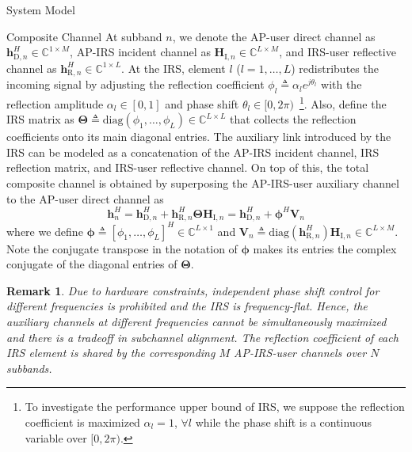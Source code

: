 \documentclass[journal]{IEEEtran}
\newtheorem{remark}{Remark}
\begin{document}
\begin{section}{System Model}
		\begin{subsection}{Composite Channel}
			At subband $n$, we denote the AP-user direct channel as $\boldsymbol{h}_{\mathrm{D},n}^H \in \mathbb{C}^{1 \times M}$, AP-IRS incident channel as $\boldsymbol{H}_{\mathrm{I},n} \in \mathbb{C}^{L \times M}$, and IRS-user reflective channel as $\boldsymbol{h}_{\mathrm{R},n}^H \in \mathbb{C}^{1 \times L}$. At the IRS, element $l$ ($l=1,\dots,L$) redistributes the incoming signal by adjusting the reflection coefficient $\phi_l \triangleq \alpha_l e^{j\theta_l}$ with the reflection amplitude $\alpha_l \in [0,1]$ and phase shift $\theta_l \in [0,2\pi)$~\footnote{To investigate the performance upper bound of IRS, we suppose the reflection coefficient is maximized $\alpha_l=1$, $\forall l$ while the phase shift is a continuous variable over $[0,2\pi)$.}. Also, define the IRS matrix as $\boldsymbol{\Theta} \triangleq \mathrm{diag}(\phi_1, \dots, \phi_L) \in \mathbb{C}^{L \times L}$ that collects the reflection coefficients onto its main diagonal entries. The auxiliary link introduced by the IRS can be modeled as a concatenation of the AP-IRS incident channel, IRS reflection matrix, and IRS-user reflective channel. On top of this, the total composite channel is obtained by superposing the AP-IRS-user auxiliary channel to the AP-user direct channel as
			\begin{equation}\label{eq:h_n}
				\boldsymbol{h}_{n}^H = \boldsymbol{h}_{\mathrm{D},n}^H + \boldsymbol{h}_{\mathrm{R},n}^H \boldsymbol{\Theta} \boldsymbol{H}_{\mathrm{I},n} = \boldsymbol{h}_{\mathrm{D},n}^H + \boldsymbol{\phi}^H \boldsymbol{V}_{n}
			\end{equation}
			where we define $\boldsymbol{\phi} \triangleq [\phi_1, \dots, \phi_L]^H \in \mathbb{C}^{L \times 1}$ and $\boldsymbol{V}_{n} \triangleq \mathrm{diag}(\boldsymbol{h}_{\mathrm{R},n}^H)\boldsymbol{H}_{\mathrm{I},n} \in \mathbb{C}^{L \times M}$. Note the conjugate transpose in the notation of $\boldsymbol{\phi}$ makes its entries the complex conjugate of the diagonal entries of $\boldsymbol{\Theta}$.
			\begin{remark}\label{re:irs_frequency_flat}
				Due to hardware constraints, independent phase shift control for different frequencies is prohibited and the IRS is frequency-flat. Hence, the auxiliary channels at different frequencies cannot be simultaneously maximized and there is a tradeoff in subchannel alignment. The reflection coefficient of each IRS element is shared by the corresponding $M$ AP-IRS-user channels over $N$ subbands.
			\end{remark}
		\end{subsection}



\end{section}
\end{document}
